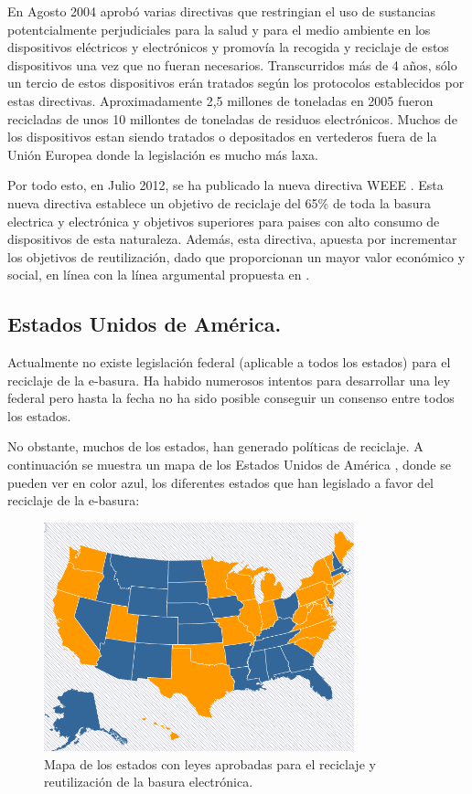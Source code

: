 En Agosto 2004 aprobó varias directivas que restringian el uso de sustancias potentcialmente perjudiciales para la salud y para el medio ambiente en los dispositivos eléctricos y electrónicos y promovía la recogida y reciclaje de estos dispositivos una vez que no fueran necesarios. Transcurridos más de 4 años, sólo un tercio de estos dispositivos erán tratados según los protocolos establecidos por estas directivas. Aproximadamente 2,5 millones de toneladas en 2005 fueron recicladas de unos 10 millontes de toneladas de residuos electrónicos. Muchos de los dispositivos estan siendo tratados o depositados en vertederos fuera de la Unión Europea donde la legislación es mucho más laxa.

Por todo esto, en Julio 2012, se ha publicado la nueva directiva WEEE \cite{WEEE}. Esta nueva directiva establece un objetivo de reciclaje del 65\% de toda la basura electrica y electrónica y objetivos superiores para paises con alto consumo de dispositivos de esta naturaleza. Además, esta directiva, apuesta por incrementar los objetivos de reutilización, dado que proporcionan un mayor valor económico y social, en línea con la línea argumental propuesta en \cite{reusing-silicon}.

\subsection{Estados Unidos de América.}

Actualmente no existe legislación federal (aplicable a todos los estados) para el reciclaje de la e-basura. Ha habido numerosos intentos para desarrollar una ley federal pero hasta la fecha no ha sido posible conseguir un consenso entre todos los estados.

No obstante, muchos de los estados, han generado políticas de reciclaje. A continuación se muestra un mapa de los Estados Unidos de América \cite{ercc}, donde se pueden ver en color azul, los diferentes estados que han legislado a favor del reciclaje de la e-basura:

\begin{figure}[H]
\begin{center}
\includegraphics[width=0.8\textwidth]{img/usa_map}
\caption{Mapa de los estados con leyes aprobadas para el reciclaje y reutilización de la basura electrónica.}
\end{center}
\end{figure}

